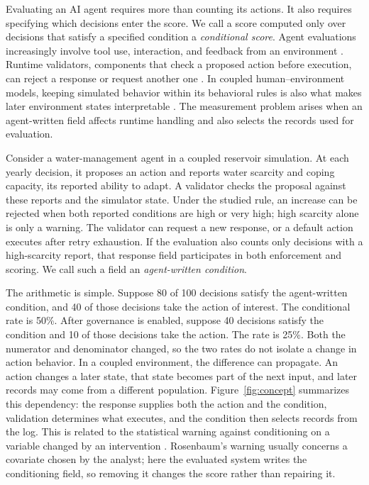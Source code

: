 \documentclass{article}
\begin{document}
Evaluating an AI agent requires more than counting its actions. It also requires specifying which decisions enter the score. We call a score computed only over decisions that satisfy a specified condition a \emph{conditional score}. Agent evaluations increasingly involve tool use, interaction, and feedback from an environment \citep{liu2023agentbench,ma2024agentboard,zhou2024webarena,kapoor2024agents,osworld2024,agentcompany2025}. Runtime validators, components that check a proposed action before execution, can reject a response or request another one \citep{rebedea2023nemo,wang2026agentspec}. In coupled human--environment models, keeping simulated behavior within its behavioral rules is also what makes later environment states interpretable \citep{khan2017coupled,lin2022cnhs,streefkerk2023drought}. The measurement problem arises when an agent-written field affects runtime handling and also selects the records used for evaluation.

Consider a water-management agent in a coupled reservoir simulation. At each yearly decision, it proposes an action and reports water scarcity and coping capacity, its reported ability to adapt. A validator checks the proposal against these reports and the simulator state. Under the studied rule, an increase can be rejected when both reported conditions are high or very high; high scarcity alone is only a warning. The validator can request a new response, or a default action executes after retry exhaustion. If the evaluation also counts only decisions with a high-scarcity report, that response field participates in both enforcement and scoring. We call such a field an \emph{agent-written condition}.

The arithmetic is simple. Suppose 80 of 100 decisions satisfy the agent-written condition, and 40 of those decisions take the action of interest. The conditional rate is 50\%. After governance is enabled, suppose 40 decisions satisfy the condition and 10 of those decisions take the action. The rate is 25\%. Both the numerator and denominator changed, so the two rates do not isolate a change in action behavior. In a coupled environment, the difference can propagate. An action changes a later state, that state becomes part of the next input, and later records may come from a different population. Figure~\ref{fig:concept} summarizes this dependency: the response supplies both the action and the condition, validation determines what executes, and the condition then selects records from the log. This is related to the statistical warning against conditioning on a variable changed by an intervention \citep{rosenbaum1984adjustment}. Rosenbaum's warning usually concerns a covariate chosen by the analyst; here the evaluated system writes the conditioning field, so removing it changes the score rather than repairing it.
\end{document}
